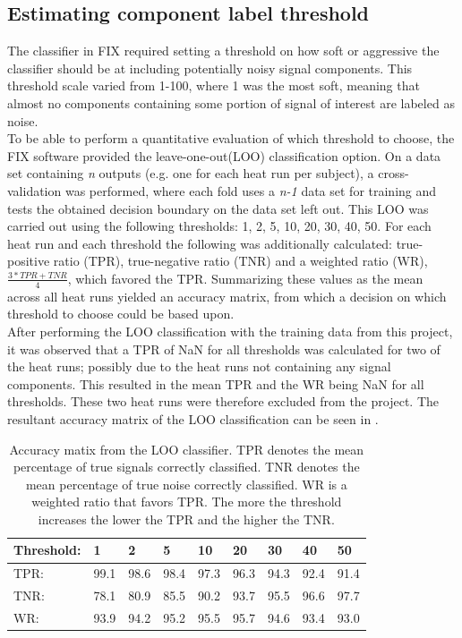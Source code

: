 \subsection{Estimating component label threshold}
The classifier in FIX required setting a threshold on how soft or aggressive the classifier should be at including potentially noisy signal components. This threshold scale varied from 1-100, where 1 was the most soft, meaning that almost no components containing some portion of signal of interest are labeled as noise. \\
To be able to perform a quantitative evaluation of which threshold to choose, the FIX software provided the leave-one-out(LOO) classification option. On a data set containing \textit{n} outputs (e.g. one for each heat run per subject), a cross-validation was performed, where each fold uses a \textit{n-1} data set for training and tests the obtained decision boundary on the data set left out. This LOO was carried out using the following thresholds: 1, 2, 5, 10, 20, 30, 40, 50. For each heat run and each threshold the following was additionally calculated: true-positive ratio (TPR), true-negative ratio (TNR) and a weighted ratio (WR), $\frac{3*TPR+TNR}{4}$, which favored the TPR. Summarizing these values as the mean across all heat runs yielded an accuracy matrix, from which a decision on which threshold to choose could be based upon. \\
After performing the LOO classification with the training data from this project, it was observed that a TPR of NaN for all thresholds was calculated for two of the heat runs; possibly due to the heat runs not containing any signal components. This resulted in the mean TPR and the WR being NaN for all thresholds. These two heat runs were therefore excluded from the project. The resultant accuracy matrix of the LOO classification can be seen in .

\begin{table}[H] 
	\caption{Accuracy matix from the LOO classifier. TPR denotes the mean percentage of true signals correctly classified. TNR denotes the mean percentage of true noise correctly classified. WR is a weighted ratio that favors TPR. The more the threshold increases the lower the TPR and the higher the TNR.}\label{tab:decisionmatrix}
	\begin{tabular}{l|llllllll}
		Threshold:                              & 1    & 2    & 5    & 10   & 20   & 30   & 40   & 50   \\ \hline
		TPR:                                    & 99.1 & 98.6 & 98.4 & 97.3 & 96.3 & 94.3 & 92.4 & 91.4 \\ %
		TNR:                                    & 78.1 & 80.9 & 85.5 & 90.2 & 93.7 & 95.5 & 96.6 & 97.7 \\ %
		WR: & 93.9 & 94.2 & 95.2 & 95.5 & 95.7 & 94.6 & 93.4 & 93.0
	\end{tabular}
\end{table}


